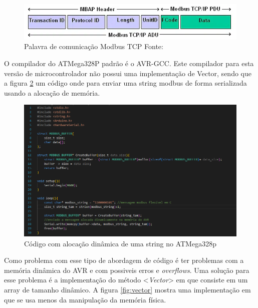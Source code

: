 \begin{figure}[h]
	\centering
	\label{fig:teste}
		\includegraphics[keepaspectratio=true,scale=0.6]{figuras/tans.jpg}
	\caption{Palavra de comunicação Modbus TCP Fonte:\cite{modbus2006}}
\end{figure}

O compilador do ATMega328P padrão é o AVR-GCC. Este compilador para esta versão de microcontrolador não possui uma implementação de Vector, sendo que a figura \ref{fig:avr_memcpy} um código onde para enviar uma string modbus de forma serializada usando a alocação de memória.

 
\begin{figure}[h]
	\centering
	\label{fig:avr_memcpy}
		\includegraphics[keepaspectratio=true,scale=0.4]{figuras/memcpy_avr.png}
	\caption{Código com alocação dinâmica de uma string no ATMega328p}
\end{figure}


Como problema com esse tipo de abordagem de código é ter problemas com a memória dinâmica do AVR e com possiveis erros e \textit{overflows}. Uma solução para esse problema é a implementação do método <\textit{Vector}> em que consiste em um array de tamanho dinâmico. A figura \ref{fig:vector} mostra uma implementação em que se usa menos da manipulação da memória física.



